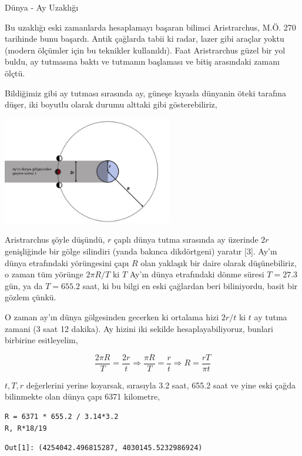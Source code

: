 \documentclass[12pt,fleqn]{article}\usepackage{../../common}
\begin{document}
Dünya - Ay Uzaklığı

Bu uzaklığı eski zamanlarda hesaplamayı başaran bilimci Aristrarchus, M.Ö. 270
tarihinde bunu başardı. Antik çağlarda tabii ki radar, lazer gibi araçlar yoktu
(modern ölçümler için bu teknikler kullanıldı). Faat Aristrarchus güzel bir
yol buldu, ay tutmasına baktı ve tutmanın başlaması ve bitiş arasındaki zamanı
ölçtü.

Bildiğimiz gibi ay tutması sırasında ay, güneşe kıyasla dünyanin öteki tarafına
düşer, iki boyutlu olarak durumu alttaki gibi gösterebiliriz,

\includegraphics[width=20em]{phy_077_anc_01.jpg}

Aristrarchus şöyle düşündü, $r$ çaplı dünya tutma sırasında ay üzerinde $2r$
genişliğinde bir gölge silindiri (yanda bakınca dikdörtgeni) yaratır [3]. Ay'ın
dünya etrafındaki yörüngesini çapı $R$ olan yaklaşık bir daire olarak
düşünebiliriz, o zaman tüm yörünge $2\pi R / T$ ki $T$ Ay'ın dünya etrafındaki
dönme süresi $T = 27.3$ gün, ya da $T = 655.2$ saat, ki bu bilgi en eski
çağlardan beri biliniyordu, basit bir gözlem çünkü.

O zaman ay'ın dünya gölgesinden gecerken ki ortalama hizi $2r / t$ ki $t$ ay
tutma zamani (3 saat 12 dakika). Ay hizini iki sekilde hesaplayabiliyoruz,
bunlari birbirine esitleyelim,

$$
\frac{2\pi R}{T} = \frac{2r}{t} \Rightarrow
\frac{\pi R}{T} = \frac{r}{t} \Rightarrow
R = \frac{r T}{\pi t}
$$

$t,T,r$ değerlerini yerine koyarsak, sırasıyla 3.2 saat, 655.2 saat ve yine eski
çağda bilinmekte olan dünya çapı 6371 kilometre,

\begin{verbatim}
R = 6371 * 655.2 / 3.14*3.2
R, R*18/19
\end{verbatim}

\begin{verbatim}
Out[1]: (4254042.496815287, 4030145.5232986924)
\end{verbatim}
\end{document}
